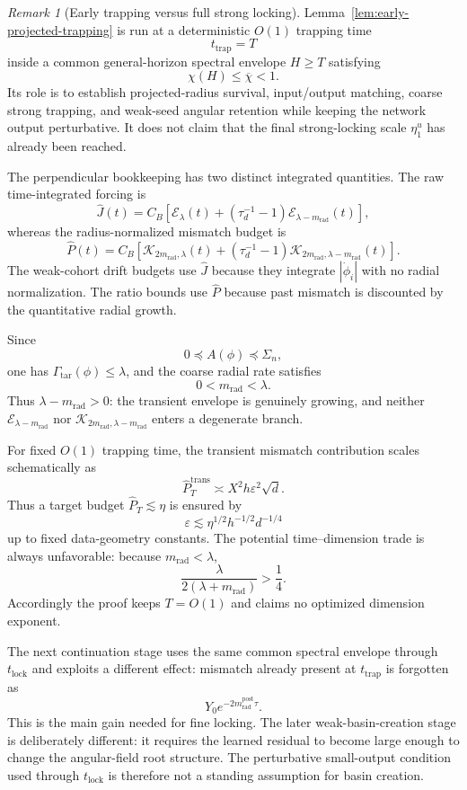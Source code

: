 \documentclass{article} %
\theoremstyle{plain}
\theoremstyle{definition}
\theoremstyle{remark}
\newtheorem{remark}[theorem]{Remark}
\begin{document}
\begin{remark}[Early trapping versus full strong locking]
\label{rem:early-trap-vs-full-lock}
Lemma~\ref{lem:early-projected-trapping} is run at a deterministic
$O(1)$ trapping time
\[
t_{\mathrm{trap}}=T
\]
inside a common general-horizon spectral envelope $H\ge T$ satisfying
\[
\chi(H)\le\overline\chi<1.
\]
Its role is to establish projected-radius survival, input/output matching,
coarse strong trapping, and weak-seed angular retention while keeping the
network output perturbative.  It does not claim that the final strong-locking
scale $\eta_1^u$ has already been reached.

The perpendicular bookkeeping has two distinct integrated quantities.  The
raw time-integrated forcing is
\[
\widehat J(t)
=
C_B\left[
\mathcal E_\lambda(t)
+
(\tau_d^{-1}-1)
\mathcal E_{\lambda-m_{\mathrm{rad}}}(t)
\right],
\]
whereas the radius-normalized mismatch budget is
\[
\widehat P(t)
=
C_B\left[
\mathcal K_{2m_{\mathrm{rad}},\lambda}(t)
+
(\tau_d^{-1}-1)
\mathcal K_{2m_{\mathrm{rad}},\lambda-m_{\mathrm{rad}}}(t)
\right].
\]
The weak-cohort drift budgets use $\widehat J$ because they integrate
$|\dot\phi_i|$ with no radial normalization.  The ratio bounds use
$\widehat P$ because past mismatch is discounted by the quantitative radial
growth.

Since
\[
0\preceq A(\phi)\preceq\Sigma_n,
\]
one has $\Gamma_{\mathrm{tar}}(\phi)\le\lambda$, and the coarse radial rate
satisfies
\[
\boxed{0<m_{\mathrm{rad}}<\lambda.}
\]
Thus $\lambda-m_{\mathrm{rad}}>0$: the transient envelope is genuinely
growing, and neither $\mathcal E_{\lambda-m_{\mathrm{rad}}}$ nor
$\mathcal K_{2m_{\mathrm{rad}},\lambda-m_{\mathrm{rad}}}$ enters a
degenerate branch.

For fixed $O(1)$ trapping time, the transient mismatch contribution scales
schematically as
\[
\widehat P_T^{\mathrm{trans}}
\asymp
X^2h\varepsilon^2\sqrt d.
\]
Thus a target budget $\widehat P_T\lesssim\eta$ is ensured by
\[
\boxed{
\varepsilon
\lesssim
\eta^{1/2}h^{-1/2}d^{-1/4}
}
\]
up to fixed data-geometry constants.  The potential time--dimension trade is
always unfavorable: because $m_{\mathrm{rad}}<\lambda$,
\[
\frac{\lambda}{2(\lambda+m_{\mathrm{rad}})}>\frac14.
\]
Accordingly the proof keeps $T=O(1)$ and claims no optimized dimension
exponent.

The next continuation stage uses the same common spectral envelope through
$t_{\mathrm{lock}}$ and exploits a different effect: mismatch already present
at $t_{\mathrm{trap}}$ is forgotten as
\[
Y_0e^{-2m_{\mathrm{rad}}^{\mathrm{post}}\tau}.
\]
This is the main gain needed for fine locking.  The later weak-basin-creation
stage is deliberately different: it requires the learned residual to become
large enough to change the angular-field root structure.  The perturbative
small-output condition used through $t_{\mathrm{lock}}$ is therefore not a
standing assumption for basin creation.
\end{remark}
\end{document}
